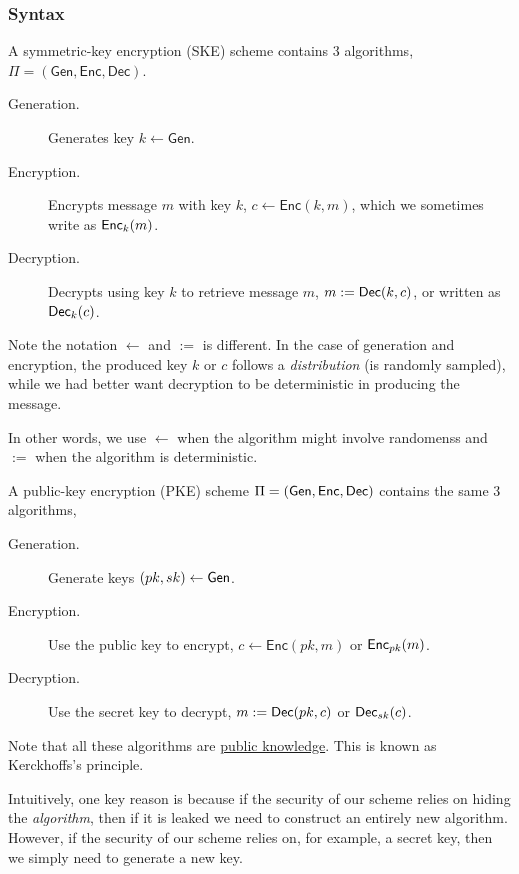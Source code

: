 \subsubsection{Syntax}
\begin{definition}
    A symmetric-key encryption (SKE) scheme contains 3 algorithms, $\Pi = (\mathsf{Gen}, \mathsf{Enc}, \mathsf{Dec})$.

    \begin{description}
        \item[Generation.] Generates key $k\leftarrow \mathsf{Gen}$.
        \item[Encryption.] Encrypts message $m$ with key $k$, $c\leftarrow \mathsf{Enc}(k, m)$, which we sometimes write as $\operatorname{\mathsf{Enc}}_k(m)$.
        \item[Decryption.] Decrypts using key $k$ to retrieve message $m$, $m := \operatorname{\mathsf{Dec}}(k, c)$, or written as $\operatorname{\mathsf{Dec}}_k(c)$.
    \end{description}
    Note the notation $\leftarrow$ and $:=$ is different. In the case of generation and encryption, the produced key $k$ or $c$ follows a \emph{distribution} (is randomly sampled), while we had better want decryption to be deterministic in producing the message. 
    
    In other words, we use $\leftarrow$ when the algorithm might involve randomenss and $:=$ when the algorithm is deterministic.
\end{definition}

\begin{definition}
    A public-key encryption (PKE) scheme $\Pi = (\operatorname{\mathsf{Gen}}, \operatorname{\mathsf{Enc}}, \operatorname{\mathsf{Dec}})$ contains the same $3$ algorithms,

    \begin{description}
        \item[Generation.] Generate keys $(pk, sk)\leftarrow \operatorname{\mathsf{Gen}}$.
        \item[Encryption.] Use the public key to encrypt, $c\leftarrow \mathsf{Enc}(pk, m)$ or $\operatorname{\mathsf{Enc}}_{pk}(m)$.
        \item[Decryption.] Use the secret key to decrypt, $m:=\operatorname{\mathsf{Dec}}(pk, c)$ or $\operatorname{\mathsf{Dec}}_{sk}(c)$.
    \end{description}
\end{definition}

\begin{remark}
    Note that all these algorithms are \ul{public knowledge}. This is known as Kerckhoffs's principle.

    Intuitively, one key reason is because if the security of our scheme relies on hiding the \emph{algorithm}, then if it is leaked we need to construct an entirely new algorithm. However, if the security of our scheme relies on, for example, a secret key, then we simply need to generate a new key.
\end{remark}

